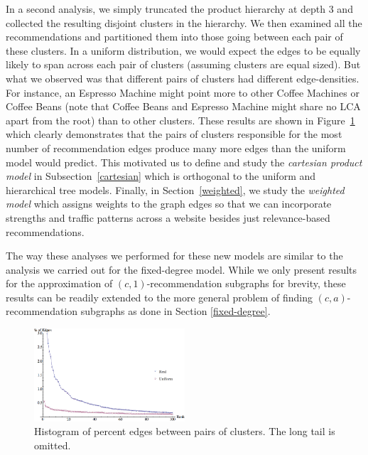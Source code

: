 In a second analysis, we simply truncated the product hierarchy
at depth 3 and collected the resulting disjoint clusters in the hierarchy. We
then examined all the recommendations and partitioned them into those going between each pair of these clusters. In a uniform distribution, we would expect the
edges to be equally likely to span across each pair of clusters
(assuming clusters are equal sized). But what we observed was that
different pairs of clusters had different edge-densities. For instance, an Espresso Machine might point more to other Coffee Machines or
Coffee Beans (note that Coffee Beans and Espresso Machine might share
no LCA apart from the root) than to other clusters. These results are
shown in Figure~\ref{fig:cart-emp} which clearly demonstrates that the pairs of clusters
responsible for the most number of recommendation edges
produce many more edges than the uniform model would predict.  This
motivated us to define and study the {\em cartesian product model} in
Subsection~\ref{cartesian} which is orthogonal to the uniform and
hierarchical tree models. Finally, in Section~\ref{weighted}, we study the {\em weighted model}
which assigns weights to the graph edges so that we can incorporate strengths and traffic
patterns across a website besides just relevance-based recommendations.

The way these analyses we performed for these new models are similar to the
analysis we carried out for the fixed-degree model. While we only present
results for the approximation of $(c,1)$-recommendation subgraphs for brevity, 
these results can be readily extended to the more general problem of finding
$(c,a)$-recommendation subgraphs as done in Section \ref{fixed-degree}.

\begin{figure}
\centering
\includegraphics[width=0.5\textwidth]{images/cartesian_histogram.png}
\begin{minipage}{1\textwidth}
\caption{Histogram of percent edges between pairs of clusters. The long tail is omitted.}
\label{fig:cart-emp}
\vspace{-0.2in}
\end{minipage}
\end{figure}

